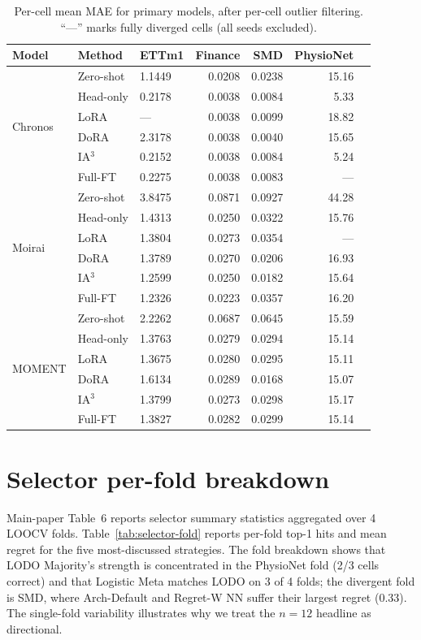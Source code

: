 \begin{table}[ht]
\centering
\caption{Per-cell mean MAE for primary models, after per-cell outlier filtering. ``---'' marks fully diverged cells (all seeds excluded).}
\label{tab:per-cell-mae}
\small
\begin{tabular}{lllrrrr}
\toprule
Model & Method & ETTm1 & Finance & SMD & PhysioNet \\
\midrule
\multirow{6}{*}{Chronos}
 & Zero-shot & 1.1449 & 0.0208 & 0.0238 & 15.16 \\
 & Head-only & 0.2178 & 0.0038 & 0.0084 & 5.33 \\
 & LoRA      & ---    & 0.0038 & 0.0099 & 18.82 \\
 & DoRA      & 2.3178 & 0.0038 & 0.0040 & 15.65 \\
 & IA$^3$    & 0.2152 & 0.0038 & 0.0084 & 5.24 \\
 & Full-FT   & 0.2275 & 0.0038 & 0.0083 & --- \\
\midrule
\multirow{6}{*}{Moirai}
 & Zero-shot & 3.8475 & 0.0871 & 0.0927 & 44.28 \\
 & Head-only & 1.4313 & 0.0250 & 0.0322 & 15.76 \\
 & LoRA      & 1.3804 & 0.0273 & 0.0354 & --- \\
 & DoRA      & 1.3789 & 0.0270 & 0.0206 & 16.93 \\
 & IA$^3$    & 1.2599 & 0.0250 & 0.0182 & 15.64 \\
 & Full-FT   & 1.2326 & 0.0223 & 0.0357 & 16.20 \\
\midrule
\multirow{6}{*}{MOMENT}
 & Zero-shot & 2.2262 & 0.0687 & 0.0645 & 15.59 \\
 & Head-only & 1.3763 & 0.0279 & 0.0294 & 15.14 \\
 & LoRA      & 1.3675 & 0.0280 & 0.0295 & 15.11 \\
 & DoRA      & 1.6134 & 0.0289 & 0.0168 & 15.07 \\
 & IA$^3$    & 1.3799 & 0.0273 & 0.0298 & 15.17 \\
 & Full-FT   & 1.3827 & 0.0282 & 0.0299 & 15.14 \\
\bottomrule
\end{tabular}
\end{table}

\section{Selector per-fold breakdown}
\label{sec:selector-fold}
Main-paper Table~6 reports selector summary statistics aggregated over 4 LOOCV folds. Table~\ref{tab:selector-fold} reports per-fold top-1 hits and mean regret for the five most-discussed strategies. The fold breakdown shows that LODO Majority's strength is concentrated in the PhysioNet fold (2/3 cells correct) and that Logistic Meta matches LODO on 3 of 4 folds; the divergent fold is SMD, where Arch-Default and Regret-W NN suffer their largest regret (0.33). The single-fold variability illustrates why we treat the $n{=}12$ headline as directional.

